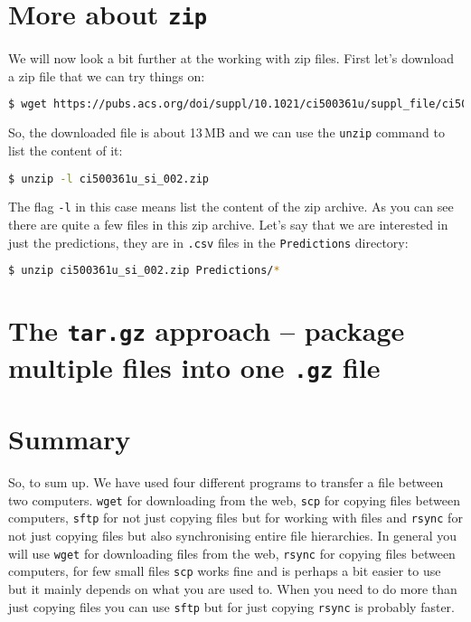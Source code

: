 \documentclass[watermark]{pbpreprint}
\begin{document}
\section{More about \texttt{zip}}
We will now look a bit further at the working with zip files. First let's
download a zip file that we can try things on:
%
\begin{lstlisting}[language=bash,escapechar={|},basicstyle=\ttfamily\footnotesize,breaklines=true,
           postbreak=\mbox{\textcolor{red}{$\nicearrow$}\space}]
$ wget https://pubs.acs.org/doi/suppl/10.1021/ci500361u/suppl_file/ci500361u_si_002.zip
\end{lstlisting}
So, the downloaded file is about 13\,MB and we can use the \texttt{unzip} command to list the content of it:
%
\begin{lstlisting}[language=bash,escapechar={|},basicstyle=\ttfamily\footnotesize]
$ unzip -l ci500361u_si_002.zip
\end{lstlisting}
The flag \texttt{-l} in this case means list the content of the zip archive. As you can
see there are quite a few files in this zip archive. Let's say that we are
interested in just the predictions, they are in \texttt{.csv} files in the
\texttt{Predictions} directory:
%
\begin{lstlisting}[language=bash,escapechar={|},basicstyle=\ttfamily\footnotesize]
$ unzip ci500361u_si_002.zip Predictions/*
\end{lstlisting}

\section{The \texttt{tar.gz} approach -- package multiple files into one \texttt{.gz} file}

\section{Summary}
So, to sum up. We have used four different programs to transfer a file between
two computers. \texttt{wget} for downloading from the web,  \texttt{scp} for
copying files between computers, \texttt{sftp} for not just copying files but
for working with files and \texttt{rsync} for not just copying files but also
synchronising entire file hierarchies. In general you will use \texttt{wget}
for downloading files from the web, \texttt{rsync} for copying files between
computers, for few small files \texttt{scp} works fine and is perhaps a bit
easier to use but it mainly depends on what you are used to. When you need to
do more than just copying files you can use \texttt{sftp} but for just copying
\texttt{rsync} is probably faster.
\end{document}
